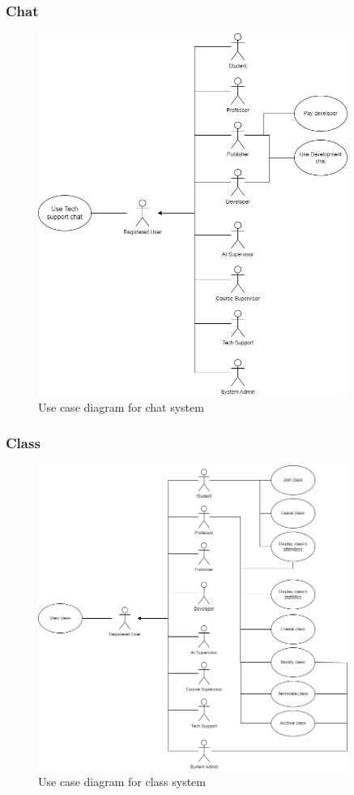 \subsubsection{Chat}
\begin{figure}[h]
	\centering
	\includegraphics[width=0.9\textwidth]{images/UC-chat.png}
	\caption{Use case diagram for chat system}
	\label{fig:UC-chat}
\end{figure}

\newpage
\subsubsection{Class}
\begin{figure}[h]
	\centering
	\includegraphics[width=0.9\textwidth]{images/UC-class.png}
	\caption{Use case diagram for class system}
	\label{fig:UC-class}
\end{figure}

